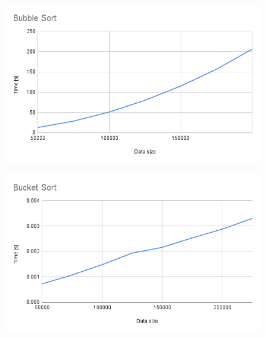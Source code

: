 \begin{minipage}{0.5\textwidth}
    \begin{figure}[H]
        \centering
        \includegraphics[width=1.0\textwidth]{content/Bubble_Sort.png}
        \label{fig:Bubble_Sort}
    \end{figure}
\end{minipage}
\begin{minipage}{0.5\textwidth}
    \begin{figure}[H]
        \centering
        \includegraphics[width=1.0\textwidth]{content/Bucket_Sort.png}
        \label{fig:Bucket_Sort}
    \end{figure}
\end{minipage}
